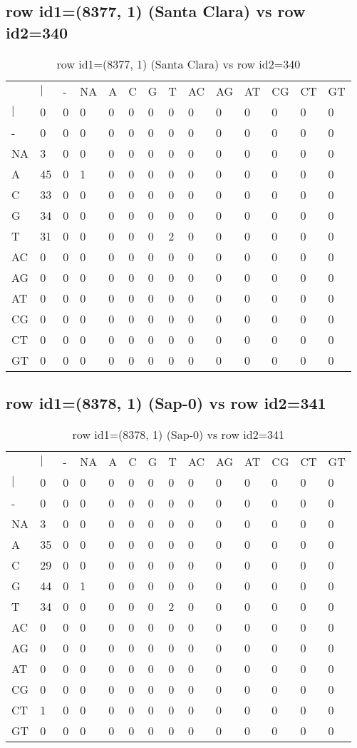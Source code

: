 \subsection{row id1=(8377, 1) (Santa Clara) vs row id2=340}
\begin{center}
\begin{longtable}{|l|l|l|l|l|l|l|l|l|l|l|l|l|l|}
\caption{row id1=(8377, 1) (Santa Clara) vs row id2=340} \label{table_dm414}\\
\hline
\\
\hline
&$|$&-&NA&A&C&G&T&AC&AG&AT&CG&CT&GT\\
$|$&0&0&0&0&0&0&0&0&0&0&0&0&0\\
-&0&0&0&0&0&0&0&0&0&0&0&0&0\\
NA&3&0&0&0&0&0&0&0&0&0&0&0&0\\
A&45&0&1&0&0&0&0&0&0&0&0&0&0\\
C&33&0&0&0&0&0&0&0&0&0&0&0&0\\
G&34&0&0&0&0&0&0&0&0&0&0&0&0\\
T&31&0&0&0&0&0&2&0&0&0&0&0&0\\
AC&0&0&0&0&0&0&0&0&0&0&0&0&0\\
AG&0&0&0&0&0&0&0&0&0&0&0&0&0\\
AT&0&0&0&0&0&0&0&0&0&0&0&0&0\\
CG&0&0&0&0&0&0&0&0&0&0&0&0&0\\
CT&0&0&0&0&0&0&0&0&0&0&0&0&0\\
GT&0&0&0&0&0&0&0&0&0&0&0&0&0\\
\hline
\end{longtable}
\end{center}

\subsection{row id1=(8378, 1) (Sap-0) vs row id2=341}
\begin{center}
\begin{longtable}{|l|l|l|l|l|l|l|l|l|l|l|l|l|l|}
\caption{row id1=(8378, 1) (Sap-0) vs row id2=341} \label{table_dm416}\\
\hline
\\
\hline
&$|$&-&NA&A&C&G&T&AC&AG&AT&CG&CT&GT\\
$|$&0&0&0&0&0&0&0&0&0&0&0&0&0\\
-&0&0&0&0&0&0&0&0&0&0&0&0&0\\
NA&3&0&0&0&0&0&0&0&0&0&0&0&0\\
A&35&0&0&0&0&0&0&0&0&0&0&0&0\\
C&29&0&0&0&0&0&0&0&0&0&0&0&0\\
G&44&0&1&0&0&0&0&0&0&0&0&0&0\\
T&34&0&0&0&0&0&2&0&0&0&0&0&0\\
AC&0&0&0&0&0&0&0&0&0&0&0&0&0\\
AG&0&0&0&0&0&0&0&0&0&0&0&0&0\\
AT&0&0&0&0&0&0&0&0&0&0&0&0&0\\
CG&0&0&0&0&0&0&0&0&0&0&0&0&0\\
CT&1&0&0&0&0&0&0&0&0&0&0&0&0\\
GT&0&0&0&0&0&0&0&0&0&0&0&0&0\\
\hline
\end{longtable}
\end{center}


